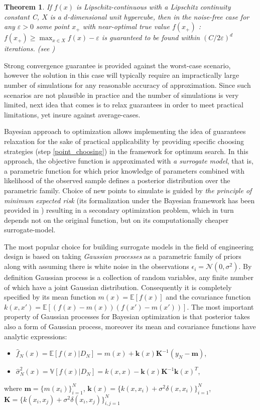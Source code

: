 \documentclass[a4paper]{jpconf}
\theoremstyle{my_theorem_style}
\newtheorem{theorem}{Theorem}
\numberwithin{equation}{section}
\begin{document}
\begin{theorem}
If $f(x)$ is Lipschitz-continuous with a Lipschitz continuity constant C, $X$ is a $d$-dimensional unit hypercube, then in the noise-free case for any $\varepsilon  > 0$ some point $x_+$ with near-optimal true value $f(x_+)$ : $f(x_+) \geq \max_{x \in X}f(x) - \varepsilon $ is guaranteed to be found within $(C/2\varepsilon)^d$ iterations. (see \cite{Betro1991})
\end{theorem}

Strong convergence guarantee is provided against the worst-case scenario, however the solution in this case will typically require an impractically large number of simulations for any reasonable accuracy of approximation. Since such scenarios are not plausible in practice and the number of simulations is very limited, next idea that comes is to relax guarantees in order to meet practical limitations, yet insure against average-cases. 

Bayesian approach to optimization allows implementing the idea of guarantees relaxation for the sake of practical applicability by providing specific choosing strategies (step \ref{point_choosing}) in the framework for optimum search. In this approach, the objective function is approximated with \emph{a surrogate model}, that is, a parametric function for which prior knowledge of parameters combined with likelihood of the observed sample defines a posterior distribution over the parametric family. Choice of new points to simulate is guided by \emph{the principle of minimum expected risk} (its formalization under the Bayesian framework has been provided in \cite{Burnaev2015}) resulting in a secondary optimization problem, which in turn depends not on the original function, but on its computationally cheaper surrogate-model.

The most popular choice for building surrogate models in the field of engineering design is based on taking \emph{Gaussian processes} as a parametric family of priors along with assuming there is white noise in the observations $\epsilon_i = \mathcal{N}(0, \sigma^2)$. By definition \cite{rasmussen2006gaussian,Burnaev2016} Gaussian process is a collection of random variables, any finite number of which have a joint Gaussian distribution. Consequently it is completely specified by its mean function $m(x) = \mathbb{E}[f(x)]$ and the covariance function $k(x, x') = \mathbb{E}[(f(x) - m(x))(f(x') - m(x'))]$. The most important property of Gaussian processes for Bayesian optimization is that posterior takes also a form of Gaussian process, moreover its mean and covariance functions have analytic expressions:
\begin{itemize}
\item $\hat{f}_N(x) = \mathbb{E}[f(x)|D_N] = m(x) + \mathbf{k}(x)\mathbf{K}^{-1} (y_N - \mathbf{m})$,
\item $\hat{\sigma}_N^2(x) = \mathbb{V}[f(x)|D_N] = k(x, x) - \mathbf{k}(x)\mathbf{K}^{-1}\mathbf{k}(x)^T$,
\end{itemize}
where $\mathbf{m} = \{m(x_i)\}_{i=1}^N$, $\mathbf{k}(x) = \{k(x, x_i) + \sigma^2 \delta(x, x_i)\}_{i=1}^N$, $\mathbf{K} = \{k(x_i, x_j) + \sigma^2 \delta(x_i, x_j)\}_{i,j=1}^N$
\end{document}
